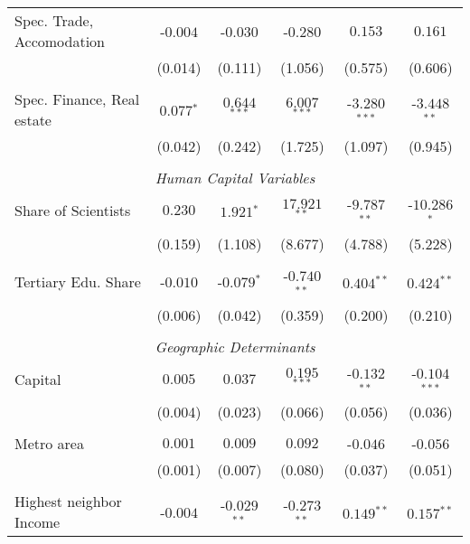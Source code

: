 \documentclass[11pt]{article}
\begin{document}
\begin{table}[!htbp]
{\begin{minipage}{\textwidth}
\begin{tabular}{@{\extracolsep{5pt}} lccccc}
Spec. Trade, Accomodation & $ $-$0.004$ & $ $-$0.030$ & $ $-$0.280$ & $0.153$ & $0.161$ \\ 
& (0.014) &  (0.111) & (1.056) & (0.575) & (0.606)\\
&\\
Spec. Finance, Real estate & $0.077$$^{*}$ & $0.644$$^{***}$ & $6.007$$^{***}$ & $ $-$3.280$$^{***}$ & $ $-$3.448$$^{**}$ \\ 
& (0.042) &  (0.242) & (1.725) & (1.097) & (0.945)\\
&\\
\multicolumn{6}{c}{\textit{Human Capital Variables}}\\
Share of Scientists & $0.230$ & $1.921$$^{*}$ & $17.921$$^{**}$ & $ $-$9.787$$^{**}$ & $ $-$10.286$$^{*}$ \\
& (0.159) &  (1.108) & (8.677) & (4.788) & (5.228)\\
&\\
Tertiary Edu. Share & $ $-$0.010$ & $ $-$0.079$$^{*}$ & $ $-$0.740$$^{**}$ & $0.404$$^{**}$ & $0.424$$^{**}$ \\
& (0.006) &  (0.042) & (0.359) & (0.200) & (0.210)\\
&\\
\multicolumn{6}{c}{\textit{Geographic Determinants}}\\
Capital & $0.005$ & $0.037$ & $0.195$$^{***}$ & $ $-$0.132$$^{**}$ & $ $-$0.104$$^{***}$ \\
& (0.004) &  (0.023) & (0.066) & (0.056) & (0.036)\\
&\\
Metro area & $0.001$ & $0.009$ & $0.092$ & $ $-$0.046$ & $ $-$0.056$ \\
& (0.001) &  (0.007) & (0.080) & (0.037) & (0.051)\\
&\\
Highest neighbor Income & $ $-$0.004$ & $ $-$0.029$$^{**}$ & $ $-$0.273$$^{**}$ & $ 0.149$$^{**}$ & $ 0.157$$^{**}$ \\ 

\end{tabular}
\end{minipage}}
\end{table}
\end{document}
